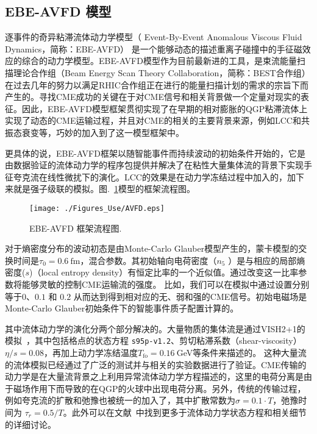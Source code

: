 \subsection{EBE-AVFD 模型}

逐事件的奇异粘滞流体动力学模型（ Event-By-Event Anomalous Viscous Fluid Dynamics，简称：EBE-AVFD）\cite{Shi:2017cpu,Jiang:2016wve,Shi:2019wzi} 是一个能够动态的描述重离子碰撞中的手征磁效应的综合的动力学模型。EBE-AVFD模型作为目前最新进的工具，是束流能量扫描理论合作组（Beam Energy Scan Theory Collaboration，简称：BEST合作组）在过去几年的努力以满足RHIC合作组正在进行的能量扫描计划的需求的宗旨下而产生的。寻找CME成功的关键在于对CME信号和相关背景做一个定量对现实的表征。因此，EBE-AVFD模型框架贯彻实现了在早期的相对膨胀的QGP粘滞流体上实现了动态的CME运输过程，并且对CME的相关的主要背景来源，例如LCC和共振态衰变等，巧妙的加入到了这一模型框架中。

更具体的说，EBE-AVFD框架以随智能事件而持续波动的初始条件开始的，它是由数据验证的流体动力学的程序包提供并解决了在粘性大量集体流的背景下实现手征夸克流在线性微扰下的演化。LCC的效果是在动力学冻结过程中加入的，加下来就是强子级联的模拟。图.~\ref{fig.avfd_flow_chart}模型的框架流程图。
\begin{figure}[!hbt]\centering
\texttt{[image: ./Figures\_Use/AVFD.eps]}
\caption{EBE-AVFD 框架流程图.\label{fig.avfd_flow_chart}}
\end{figure}

对于熵密度分布的波动初态是由Monte-Carlo Glauber模型产生的，蒙卡模型的交换时间是$\tau_0=0.6~\text{fm}$，混合参数。其初始轴向电荷密度（$n_5$ ）是与相应的局部熵密度($s$)（local entropy density）有恒定比率的一个近似值。通过改变这一比率参数将能够灵敏的控制CME运输流的强度。
比如，我们可以在模拟中通过设置\ns 分别等于$0$、$0.1$ 和 $0.2$ 从而达到得到相对应的无、弱和强的CME信号。初始电磁场是Monte-Carlo Glauber初始条件下的智能事件质子配置计算的。

其中流体动力学的演化分两个部分解决的。大量物质的集体流是通过VISH2+1的模拟~\cite{Shen:2014vra}，其中包括格点的状态方程 \texttt{s95p-v1.2}、剪切粘滞系数（shear-viscosity）$\eta/s=0.08$，再加上动力学冻结温度$T_\text{fo}=0.16~$GeV等条件来描述的。
这种大量流的流体模拟已经通过了广泛的测试并与相关的实验数据进行了验证。CME传输的动力学是在大量流背景之上利用异常流体动力学方程描述的，这里的电荷分离是由于磁场作用下而导致的在QGP的火球中出现电荷分离。另外，传统的传输过程，例如夸克流的扩散和弛豫也被统一的加入了，其中扩散常数为$\sigma=0.1\cdot T$，弛豫时间为 $\tau_r = 0.5/T$。此外可以在文献~\cite{Shi:2017cpu,Jiang:2016wve,Shi:2019wzi}中找到更多于流体动力学状态方程和相关细节的详细讨论。


